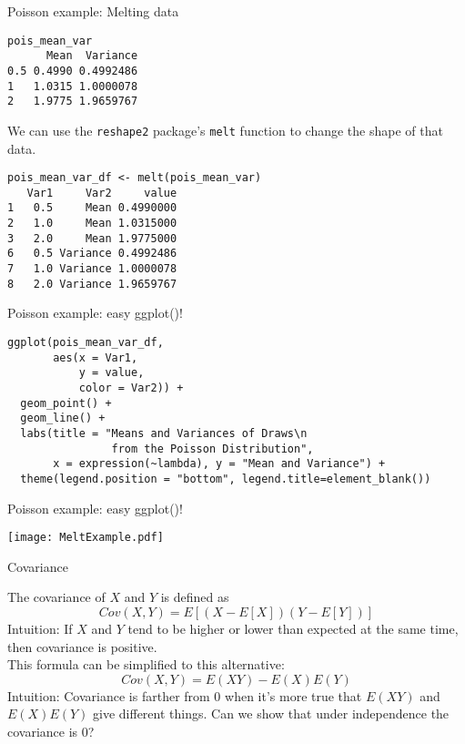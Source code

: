 \documentclass{beamer}
\begin{document}
\begin{frame}[fragile]{Poisson example: Melting data}
\begin{footnotesize}
\begin{verbatim}
pois_mean_var
      Mean  Variance
0.5 0.4990 0.4992486
1   1.0315 1.0000078
2   1.9775 1.9659767
\end{verbatim}

We can use the \texttt{reshape2} package's \texttt{melt} function to change the shape of that data.
\begin{verbatim}
pois_mean_var_df <- melt(pois_mean_var)
   Var1     Var2     value
1   0.5     Mean 0.4990000
2   1.0     Mean 1.0315000
3   2.0     Mean 1.9775000
6   0.5 Variance 0.4992486
7   1.0 Variance 1.0000078
8   2.0 Variance 1.9659767
\end{verbatim}
\end{footnotesize}
\end{frame}

\begin{frame}[fragile]{Poisson example: easy ggplot()!}
\begin{footnotesize}
\begin{verbatim}
ggplot(pois_mean_var_df,
       aes(x = Var1,
           y = value,
           color = Var2)) +
  geom_point() +
  geom_line() +
  labs(title = "Means and Variances of Draws\n
                from the Poisson Distribution", 
       x = expression(~lambda), y = "Mean and Variance") +
  theme(legend.position = "bottom", legend.title=element_blank())
\end{verbatim}
\end{footnotesize}
\end{frame}

\begin{frame}{Poisson example: easy ggplot()!}
\begin{center}\texttt{[image: MeltExample.pdf]}\end{center}
\end{frame}

\begin{frame}{Covariance}
\begin{definition}
The \alert{covariance} of $X$ and $Y$ is defined as
$$Cov(X,Y)=E\left[(X-E[X])(Y-E[Y])\right]$$
\alert{Intuition:} If $X$ and $Y$ tend to be higher or lower than expected at the same time, then covariance is positive. \\
This formula can be simplified to this alternative:
$$Cov(X,Y)=E(XY)-E(X)E(Y)$$
\alert{Intuition:} Covariance is farther from 0 when it's more true that $E(XY)$ and $E(X)E(Y)$ give different things. Can we show that under independence the covariance is 0?
\end{definition}
\end{frame}
\end{document}
